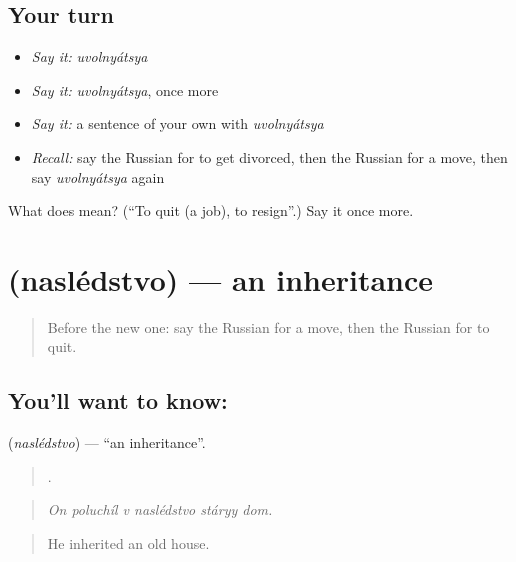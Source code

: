 \subsection*{Your turn}
\begin{itemize}
\raggedright
  \item \emph{Say it:} \emph{uvolnyátsya}
  \item \emph{Say it:} \emph{uvolnyátsya}, once more
  \item \emph{Say it:} a sentence of your own with \emph{uvolnyátsya}
  \item \emph{Recall:} say the Russian for to get divorced, then the Russian for a move, then say \emph{uvolnyátsya} again
\end{itemize}

\begin{tcolorbox}[breakable,colback=teal!4,colframe=teal!35!black,title={Before you move on}]
What does  mean? (\textquotedblleft{}To quit (a job), to resign\textquotedblright{}.) Say it once more.
\end{tcolorbox}
\section[\texorpdfstring{\ru{наследство} (naslédstvo)}{наследство (naslédstvo)}]{ (naslédstvo) — an inheritance}

\label{lesson:RU-C307-nasledstvo}



\begin{quote}
Before the new one: say the Russian for a move, then the Russian for to quit.
\end{quote}

\subsection*{You'll want to know: }
\textbf{} (\emph{naslédstvo}) — \textquotedblleft{}an inheritance\textquotedblright{}.

\begin{quote}
     .
\end{quote}

\begin{quote}
\emph{On poluchíl v naslédstvo stáryy dom.}
\end{quote}

\begin{quote}
He inherited an old house.
\end{quote}

